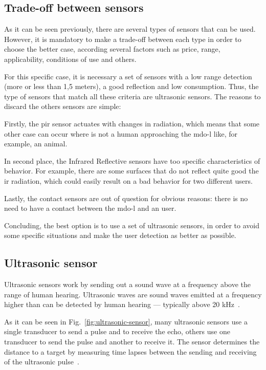 \subsection{Trade-off between sensors}
As it can be seen previously, there are several types of sensors that can be used. However, it is mandatory to make a trade-off between each type in order to choose the better case, according several factors such as price, range, applicability, conditions of use and others.

For this specific case, it is necessary a set of sensors with a low range detection (more or less than 1,5 meters), a good reflection and low consumption. Thus, the type of sensors that match all these criteria are ultrasonic sensors.
The reasons to discard the others sensors are simple:

Firstly, the \gls{pir} sensor actuates with changes in radiation, which means that some other case can occur where is not a human approaching the \gls{mdo-l} like, for example, an animal.

In second place, the Infrared Reflective sensors have too specific characteristics of behavior. 
For example, there are some surfaces that do not reflect quite good the \gls{ir} radiation, which could easily result on a bad behavior for two different users.

Lastly, the contact sensors are out of question for obvious reasons: there is no need to have a contact between the \gls{mdo-l} and an user.

Concluding, the best option is to use a set of ultrasonic sensors, in order to avoid some specific situations and make the user detection as better as possible.

\subsection{Ultrasonic sensor}
Ultrasonic sensors work by sending out a sound wave at a frequency above the range of human hearing.
Ultrasonic waves are sound waves emitted at a frequency higher than can be detected by human hearing — typically above 20 kHz~\cite{ultrasonic-sensor-img}.

As it can be seen in Fig.~\ref{fig:ultrasonic-sensor}, many ultrasonic sensors use a single transducer to send a pulse and to receive the echo, others use one transducer to send the pulse and another to receive it.  
The sensor determines the distance to a target by measuring time lapses between the sending and receiving of the ultrasonic pulse~\cite{ultrasonic-sensor}.

